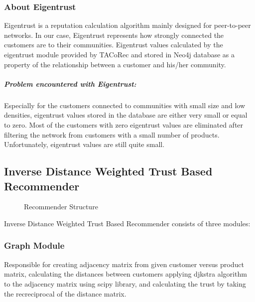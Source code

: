 \documentclass[12pt]{article}
\begin{document}
	\subsubsection{About Eigentrust}
	Eigentrust\cite{Eigentrust} is a reputation calculation algorithm mainly designed for peer-to-peer networks. In our case, Eigentrust represents how strongly connected the customers are to their communities. Eigentrust values calculated by the eigentrust module provided by TACoRec\cite{Tacorec} and stored in Neo4j database as a property of the relationship between a customer and his/her community. 
	\subparagraph{Problem encountered with Eigentrust:}
	Especially for the customers connected to communities with small size and low densities, eigentrust values stored in the database are either very small or equal to zero. Most of the customers with zero eigentrust values are eliminated after filtering the network from customers with a small number of products. Unfortunately, eigentrust values ​​are still quite small.
	
	\subsection{Inverse Distance Weighted Trust Based Recommender}
	\begin{figure}[H]
		\centering
		\caption{Recommender Structure}
	\end{figure}
	Inverse Distance Weighted Trust Based Recommender consists of three modules:
	
	\subsubsection{Graph Module} Responsible for creating adjacency matrix from given customer versus product matrix, calculating the distances between customers applying djkstra algorithm to the adjacency matrix using scipy library, and calculating the trust by taking the recreciprocal of the distance matrix.
\end{document}
